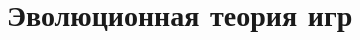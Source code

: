 \documentclass[11pt,aspectratio=43,svgnames]{beamer}
\begin{document}
 \maketitle

\begin{frame} 
	\tableofcontents
\end{frame}









\section{Эволюционная теория игр}

\begin{frame} \scriptsize
	
	
\end{frame}
\end{document}
